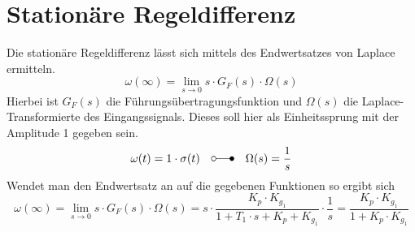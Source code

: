 \section{Stationäre Regeldifferenz}
Die stationäre Regeldifferenz lässt sich mittels des Endwertsatzes von
Laplace ermitteln.
\[
	\omega(\infty)
	= \lim_{s \rightarrow 0} s \cdot G_F(s) \cdot \Omega(s)	
\]
Hierbei ist $G_F(s)$ die Führungsübertragungsfunktion und $\Omega(s)$ die
Laplace-Transformierte des Eingangssignals. Dieses soll hier als
Einheitssprung mit der Amplitude 1 gegeben sein.
\[
	\omega(t)
	= 1 \cdot \sigma(t) \quad \laplace \quad \Omega(s) = \frac{1}{s}
\]
Wendet man den Endwertsatz an auf die gegebenen Funktionen so ergibt sich
\[
	\omega(\infty)
	= \lim_{s \rightarrow 0} s \cdot G_F(s) \cdot \Omega(s)	
	= s \cdot \frac{
		K_p \cdot K_{g_1}
	}{
		1 + T_1 \cdot s + K_p + K_{g_1}
	} \cdot \frac{1}{s}
	= \frac{K_p \cdot K_{g_1}}{1 + K_p \cdot K_{g_1}}
\]
